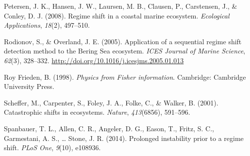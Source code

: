 \documentclass[12pt,twoside]{reedthesis}
\begin{document}
\hypertarget{ref-petersen2008regime}{}
Petersen, J. K., Hansen, J. W., Laursen, M. B., Clausen, P., Carstensen,
J., \& Conley, D. J. (2008). Regime shift in a coastal marine ecosystem.
\emph{Ecological Applications}, \emph{18}(2), 497--510.

\hypertarget{ref-rodionov_application_2005}{}
Rodionov, S., \& Overland, J. E. (2005). Application of a sequential
regime shift detection method to the Bering Sea ecosystem. \emph{ICES
Journal of Marine Science}, \emph{62}(3), 328--332.
\url{http://doi.org/10.1016/j.icesjms.2005.01.013}

\hypertarget{ref-roy_frieden_physics_1998}{}
Roy Frieden, B. (1998). \emph{Physics from Fisher information}.
Cambridge: Cambridge University Press.

\hypertarget{ref-scheffer_catastrophic_2001}{}
Scheffer, M., Carpenter, S., Foley, J. A., Folke, C., \& Walker, B.
(2001). Catastrophic shifts in ecosystems. \emph{Nature},
\emph{413}(6856), 591--596.

\hypertarget{ref-spanbauer_prolonged_2014}{}
Spanbauer, T. L., Allen, C. R., Angeler, D. G., Eason, T., Fritz, S. C.,
Garmestani, A. S., \ldots{} Stone, J. R. (2014). Prolonged instability
prior to a regime shift. \emph{PLoS One}, \emph{9}(10), e108936.


\end{document}
